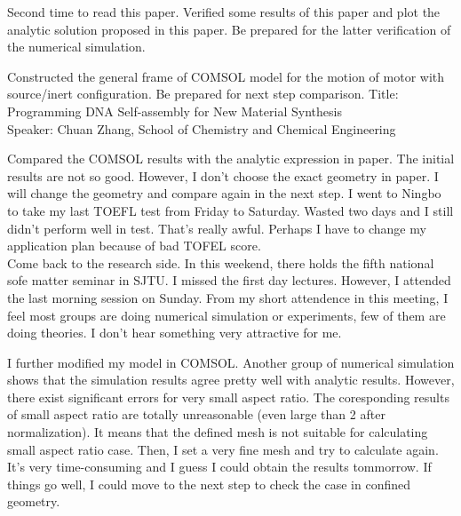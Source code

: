 \documentclass[fontsize=11pt, %
                             paper=a4, %
                             twoside, %
                             captions=tableheading,
                             index=totoc,
                             hyperref]{labbook}
\begin{document}
\begin{addmargin}[4cm]{0cm}
Second time to read this paper. Verified some results of this paper and plot the analytic solution proposed in this paper. Be prepared for the latter verification of the numerical simulation.

Constructed the general frame of COMSOL model for the motion of motor with source/inert configuration. Be prepared for next step comparison.
Title: Programming DNA Self-assembly for New Material Synthesis\\
Speaker: Chuan Zhang, School of Chemistry and Chemical Engineering

Compared the COMSOL results with the analytic expression in paper\cite{Nourhani2016}. The initial results are not so good. However, I don't choose the exact geometry in paper\cite{Nourhani2016}. I will change the geometry and compare again in the next step.
I went to Ningbo to take my last TOEFL test from Friday to Saturday. Wasted two days and I still didn't perform well in test. That's really awful. Perhaps I have to change my application plan because of bad TOFEL score.\\
Come back to the research side. In this weekend, there holds the fifth national sofe matter seminar in SJTU. I missed the first day lectures. However, I attended the last morning session on Sunday. From my short attendence in this meeting, I feel most groups are doing numerical simulation or experiments, few of them are doing theories. I don't hear something very attractive for me.

I further modified my model in COMSOL. Another group of numerical simulation shows that the simulation results agree pretty well with analytic results. However, there exist significant errors for very small aspect ratio. The coresponding results of small aspect ratio are totally unreasonable (even large than 2 after normalization). It means that the defined mesh is not suitable for calculating small aspect ratio case. Then, I set a very fine mesh and try to calculate again. It's very time-consuming and I guess I could obtain the results tommorrow. If things go well, I could move to the next step to check the case in confined geometry.


\end{addmargin}
\end{document}
